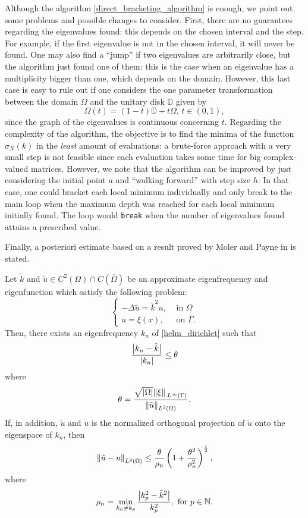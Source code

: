 \begin{remark}
    Although the algorithm \ref{direct_bracketing_algorithm} is enough, we point out some problems and possible changes to consider. First, there are no guarantees regarding the eigenvalues found: this depends on the chosen interval and the step. For example, if the first eigenvalue is not in the chosen interval, it will never be found. One may also find a ``jump'' if two eigenvalues are arbitrarily close, but the algorithm just found one of them: this is the case when an eigenvalue has a multiplicity bigger than one, which depends on the domain. However, this last case is easy to rule out if one considers the one parameter transformation between the domain \(\Omega\) and the unitary disk \(\mathbb{D}\) given by
    \[
        \Omega(t) = (1-t)\mathbb{D} + t \Omega, \, t \in (0, 1),
    \]
    since the graph of the eigenvalues is continuous concerning \(t\). Regarding the complexity of the algorithm, the objective is to find the minima of the function \(\sigma_N(k)\) in the \textit{least} amount of evaluations: a brute-force approach with a very small step is not feasible since each evaluation takes some time for big complex-valued matrices. However, we note that the algorithm can be improved by just considering the initial point \(a\) and ``walking forward'' with step size \(h\). In that case, one could bracket each local minimum individually and only break to the main loop when the maximum depth was reached for each local minimum initially found. The loop would \texttt{break} when the number of eigenvalues found attains a prescribed value.
\end{remark}

Finally, a posteriori estimate based on a result proved by Moler and Payne in \cite{moler1968bounds} is stated.
\begin{theorem}
    Let \(\tilde{k}\) and \(\tilde{u} \in C^2(\Omega) \cap C(\overline{\Omega})\) be an approximate eigenfrequency and eigenfunction which satisfy the following problem:
    \[
    \begin{cases}
        -\Delta \tilde{u} = \tilde{k}^2 u, &\text{ in } \Omega\\
        u = \xi(x), &\text{ on } \Gamma.
    \end{cases}
    \]
    Then, there exists an eigenfrequency \(k_n\) of \eqref{helm_dirichlet} such that
    \[
        \frac{\abs{{k_n} - {\tilde{k}}}}{\abs{k_n}} \leq \theta
    \]
    where
    \[
        \theta = \frac{\sqrt{\abs{\Omega}} \norm*{\xi}_{L^\infty (\Gamma)}}{\norm{\tilde{u}}_{L^2(\Omega)}}.
    \]
    If, in addition, \(\tilde{u}\) and \(u\) is the normalized orthogonal projection of \(\tilde{u}\) onto the eigenspace of \(k_n\), then
    \[
        \norm{\tilde{u} - u}_{L^2(\Omega)} \leq \frac{\theta}{\rho_n}\left(1+\frac{\theta^2}{\rho_n^2}\right)^\frac{1}{2},
    \]
    where
    \[
        \rho_n = \min_{k_n \neq k_p} \frac{\abs{k^2_p - \tilde{k}^2}}{k^2_p}, \text{ for } p \in \mathbb{N}.
    \]
\end{theorem}

